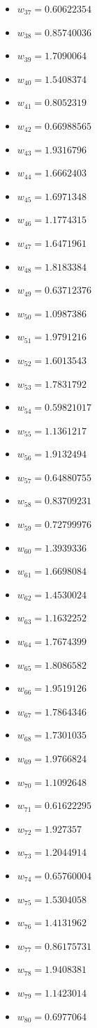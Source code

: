\documentclass[11pt]{article}
\begin{document}
\begin{itemize}
\item $w_{37} = 0.60622354$
\item $w_{38} = 0.85740036$
\item $w_{39} = 1.7090064$
\item $w_{40} = 1.5408374$
\item $w_{41} = 0.8052319$
\item $w_{42} = 0.66988565$
\item $w_{43} = 1.9316796$
\item $w_{44} = 1.6662403$
\item $w_{45} = 1.6971348$
\item $w_{46} = 1.1774315$
\item $w_{47} = 1.6471961$
\item $w_{48} = 1.8183384$
\item $w_{49} = 0.63712376$
\item $w_{50} = 1.0987386$
\item $w_{51} = 1.9791216$
\item $w_{52} = 1.6013543$
\item $w_{53} = 1.7831792$
\item $w_{54} = 0.59821017$
\item $w_{55} = 1.1361217$
\item $w_{56} = 1.9132494$
\item $w_{57} = 0.64880755$
\item $w_{58} = 0.83709231$
\item $w_{59} = 0.72799976$
\item $w_{60} = 1.3939336$
\item $w_{61} = 1.6698084$
\item $w_{62} = 1.4530024$
\item $w_{63} = 1.1632252$
\item $w_{64} = 1.7674399$
\item $w_{65} = 1.8086582$
\item $w_{66} = 1.9519126$
\item $w_{67} = 1.7864346$
\item $w_{68} = 1.7301035$
\item $w_{69} = 1.9766824$
\item $w_{70} = 1.1092648$
\item $w_{71} = 0.61622295$
\item $w_{72} = 1.927357$
\item $w_{73} = 1.2044914$
\item $w_{74} = 0.65760004$
\item $w_{75} = 1.5304058$
\item $w_{76} = 1.4131962$
\item $w_{77} = 0.86175731$
\item $w_{78} = 1.9408381$
\item $w_{79} = 1.1423014$
\item $w_{80} = 0.6977064$
\end{itemize}
\end{document}
